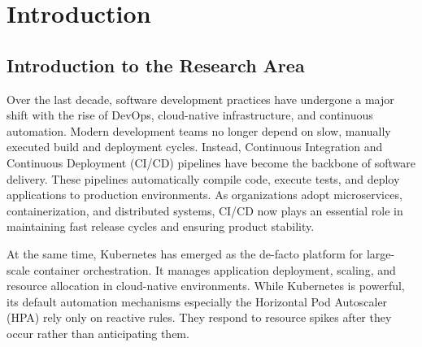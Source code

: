 \documentclass[a4paper,14pt,onecolumn]{report}
\begin{document}
	\pagestyle{empty}
	
	\clearpage
	
	\clearpage

	\pagestyle{plain}

	
	\clearpage

	
	\clearpage

	\tableofcontents
	\clearpage

	\listoftables
	\clearpage

	\listoffigures
	\clearpage

	
	\clearpage

	
	\clearpage

	\pagestyle{fancy}

\chapter{Introduction}

\section{Introduction to the Research Area}

Over the last decade, software development practices have undergone a major shift with the rise of DevOps, cloud-native infrastructure, and continuous automation. Modern development teams no longer depend on slow, manually executed build and deployment cycles. Instead, Continuous Integration and Continuous Deployment (CI/CD) pipelines have become the backbone of software delivery. These pipelines automatically compile code, execute tests, and deploy applications to production environments. As organizations adopt microservices, containerization, and distributed systems, CI/CD now plays an essential role in maintaining fast release cycles and ensuring product stability.

At the same time, Kubernetes has emerged as the de-facto platform for large-scale container orchestration. It manages application deployment, scaling, and resource allocation in cloud-native environments. While Kubernetes is powerful, its default automation mechanisms especially the Horizontal Pod Autoscaler (HPA) rely only on reactive rules. They respond to resource spikes after they occur rather than anticipating them.
\end{document}
